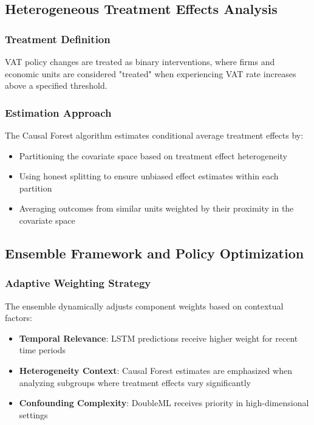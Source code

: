 \subsection{Heterogeneous Treatment Effects Analysis}\label{subsec:heterogeneous}

\subsubsection{Treatment Definition}
VAT policy changes are treated as binary interventions, where firms and economic units are considered "treated" when experiencing VAT rate increases above a specified threshold.

\subsubsection{Estimation Approach}
The Causal Forest algorithm estimates conditional average treatment effects by:
\begin{itemize}
    \item Partitioning the covariate space based on treatment effect heterogeneity
    \item Using honest splitting to ensure unbiased effect estimates within each partition
    \item Averaging outcomes from similar units weighted by their proximity in the covariate space
\end{itemize}

\subsection{Ensemble Framework and Policy Optimization}\label{subsec:hybrid}

\subsubsection{Adaptive Weighting Strategy}
The ensemble dynamically adjusts component weights based on contextual factors:
\begin{itemize}
    \item \textbf{Temporal Relevance}: LSTM predictions receive higher weight for recent time periods
    \item \textbf{Heterogeneity Context}: Causal Forest estimates are emphasized when analyzing subgroups where treatment effects vary significantly
    \item \textbf{Confounding Complexity}: DoubleML receives priority in high-dimensional settings
\end{itemize}

